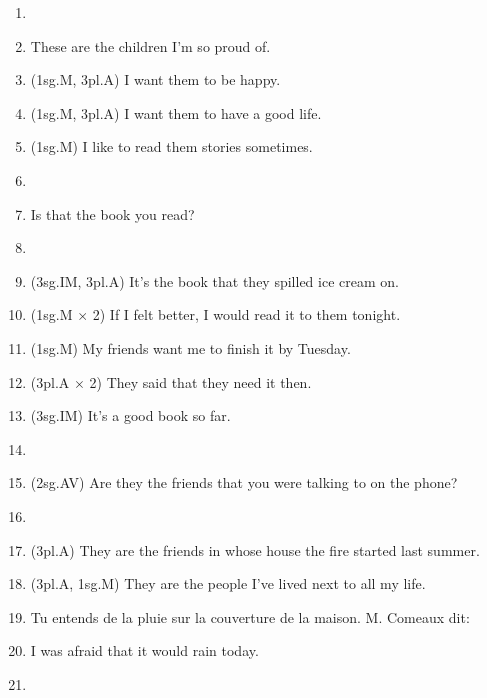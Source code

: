 \begin{enumerate}
    \item[] \\
    \item These are the children I'm so proud of.
    \item (1sg.M, 3pl.A) I want them to be happy.
    \item (1sg.M, 3pl.A) I want them to have a good life.
    \item (1sg.M) I like to read them stories sometimes.
    \item[] \\
    \item Is that the book you read?
    \item[] \\
    \item (3sg.IM, 3pl.A) It's the book that they spilled ice cream on.
    \item (1sg.M $\times$ 2) If I felt better, I would read it to them tonight.
    \item (1sg.M) My friends want me to finish it by Tuesday.
    \item (3pl.A $\times$ 2) They said that they need it then.
    \item (3sg.IM) It's a good book so far.
    \item[] \\
    \item (2sg.AV) Are they the friends that you were talking to on the phone?
    \item[] \\
    \item (3pl.A) They are the friends in whose house the fire started last summer.
    \item (3pl.A, 1sg.M) They are the people I've lived next to all my life.
    \item Tu entends de la pluie sur la couverture de la maison. M. Comeaux dit:\\
    \item I was afraid that it would rain today.
    \item[] \\

\end{enumerate}

